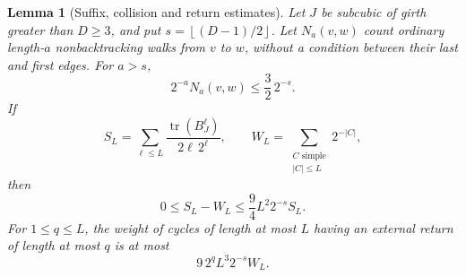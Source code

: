 \documentclass[11pt,a4paper]{article}
\numberwithin{equation}{section}
\newtheorem{lemma}[theorem]{Lemma}
\theoremstyle{definition}
\theoremstyle{remark}
\newcommand{\tr}{\operatorname{tr}}
\newcommand{\floor}[1]{\left\lfloor#1\right\rfloor}
\begin{document}
\begin{lemma}[Suffix, collision and return estimates]\label{lem:walk-errors}
Let $J$ be subcubic of girth greater than $D\ge3$, and put $s=\floor{(D-1)/2}$. Let $N_a(v,w)$ count ordinary length-$a$ nonbacktracking walks from $v$ to $w$, without a condition between their last and first edges. For $a>s$,
\begin{equation}\label{eq:suffix}
 2^{-a}N_a(v,w)\le\frac32\,2^{-s}.
\end{equation}
If
\[
 S_L=\sum_{\ell\le L}\frac{\tr(B_J^\ell)}{2\ell\,2^\ell},
 \qquad W_L=\sum_{\substack{C\text{ simple}\\|C|\le L}}2^{-|C|},
\]
then
\begin{equation}\label{eq:collision}
 0\le S_L-W_L\le\frac94 L^2 2^{-s}S_L.
\end{equation}
For $1\le q\le L$, the weight of cycles of length at most $L$ having an external return of length at most $q$ is at most
\begin{equation}\label{eq:return}
 9\,2^qL^3 2^{-s}W_L.
\end{equation}
\end{lemma}
\end{document}
